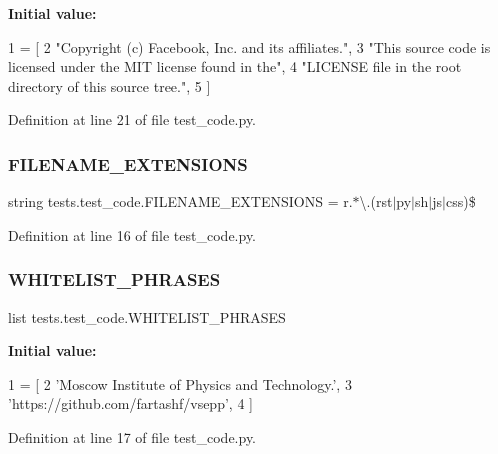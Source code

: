 {\bfseries Initial value\+:}
\begin{DoxyCode}
1 =  [
2     \textcolor{stringliteral}{"Copyright (c) Facebook, Inc. and its affiliates."},
3     \textcolor{stringliteral}{"This source code is licensed under the MIT license found in the"},
4     \textcolor{stringliteral}{"LICENSE file in the root directory of this source tree."},
5 ]
\end{DoxyCode}


Definition at line 21 of file test\+\_\+code.\+py.

\mbox{\label{namespacetests_1_1test__code_af96de422007d15272ce083c7cb9aa199}} 
\subsubsection{\texorpdfstring{F\+I\+L\+E\+N\+A\+M\+E\+\_\+\+E\+X\+T\+E\+N\+S\+I\+O\+NS}{FILENAME\_EXTENSIONS}}
{\footnotesize\ttfamily string tests.\+test\+\_\+code.\+F\+I\+L\+E\+N\+A\+M\+E\+\_\+\+E\+X\+T\+E\+N\+S\+I\+O\+NS = r\textquotesingle{}.$\ast$\textbackslash{}.(rst$\vert$py$\vert$sh$\vert$js$\vert$css)\$\textquotesingle{}}



Definition at line 16 of file test\+\_\+code.\+py.

\mbox{\label{namespacetests_1_1test__code_a2e9ba15b1b3ff770e9bdab0abe86ef37}} 
\subsubsection{\texorpdfstring{W\+H\+I\+T\+E\+L\+I\+S\+T\+\_\+\+P\+H\+R\+A\+S\+ES}{WHITELIST\_PHRASES}}
{\footnotesize\ttfamily list tests.\+test\+\_\+code.\+W\+H\+I\+T\+E\+L\+I\+S\+T\+\_\+\+P\+H\+R\+A\+S\+ES}

{\bfseries Initial value\+:}
\begin{DoxyCode}
1 =  [
2     \textcolor{stringliteral}{'Moscow Institute of Physics and Technology.'},
3     \textcolor{stringliteral}{'https://github.com/fartashf/vsepp'},
4 ]
\end{DoxyCode}


Definition at line 17 of file test\+\_\+code.\+py.

